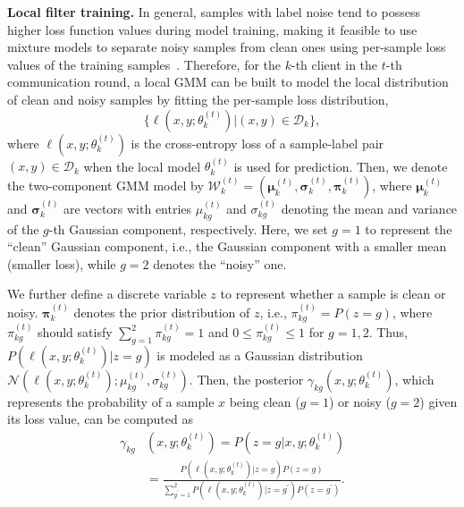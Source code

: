 \documentclass[letterpaper]{article} %
\begin{document}
\noindent
\textbf{Local filter training.}
In general, samples with label noise tend to possess higher loss function values during model training, making it feasible to use mixture models to separate noisy samples from clean ones using per-sample loss values of the training samples~\cite{BMM, li2019dividemix}.
Therefore, for the $k$-th client in the $t$-th communication round,
a local GMM can be built to model the local distribution of clean and noisy samples by fitting the per-sample loss distribution,
\begin{equation}
    \{\ell(x,y;{\theta}_{k}^{(t)})|(x,y)\in\mathcal{D}_{k}\},
\end{equation}
where $\ell(x,y;{\theta}_{k}^{(t)})$ is the cross-entropy loss of a sample-label pair $(x, y)\in\mathcal{D}_{k}$ when the local model ${\theta}_{k}^{(t)}$ is used for prediction. Then, we denote the two-component GMM model by $\mathcal{W}_{k}^{(t)}=(\bm{{\mu}}_{k}^{(t)},\bm{{\sigma}}_{k}^{(t)},{\bm{\pi}}_{k}^{(t)})$,
where $\bm{{\mu}}_{k}^{(t)}$ and $\bm{{\sigma}}_{k}^{(t)}$ are vectors with entries ${{\mu}}_{kg}^{(t)}$ and ${\sigma}_{kg}^{(t)}$ denoting the mean and variance of the $g$-th Gaussian component, respectively. Here, we set $g=1$ to represent the ``clean'' Gaussian component, i.e., the Gaussian component with a smaller mean (smaller loss), while $g=2$ denotes the ``noisy'' one.

We further define a discrete variable $z$ to represent whether a sample is clean or noisy. ${\bm{\pi}}_{k}^{(t)}$ denotes the prior distribution of $z$, i.e., ${{\pi}}_{kg}^{(t)}=P(\!z\!=\!g\!)$, where ${{\pi}}_{kg}^{(t)}$ should satisfy  $\sum_{g=1}^{2}{{\pi}}_{kg}^{(t)}=1$ and $0 \le{{\pi}}_{kg}^{(t)}\le 1$ for $g=1, 2$.
Thus, $P(\ell(x,y;{\theta}_{k}^{(t)})|z=g)$ is modeled as a Gaussian distribution $\mathcal{N}(\ell(x,y;{\theta}_{k}^{(t)}); \mu_{kg}^{(t)}, \sigma_{kg}^{(t)})$.
Then, the posterior ${\gamma}_{kg}(x,y;{\theta}_{k}^{(t)})$, which represents the probability of a sample $x$ being clean ($g=1$) or noisy ($g=2$) given its loss value, can be computed as
 \begin{equation}
    \label{Equation:E-step}
    \begin{split}
        {\gamma}_{kg}&(x,y;{\theta}_{k}^{(t)}) = P(z=g|x,y;{\theta}_{k}^{(t)})\\ &= \frac{P(\ell(x,y;{\theta}_{k}^{(t)})|z=g) P(z=g)}{\sum_{g^{\prime}=1}^{2} P(\ell(x,y;{\theta}_{k}^{(t)})|z=g^{\prime}) P(z=g^{\prime})}.
    \end{split}
\end{equation}
\end{document}
